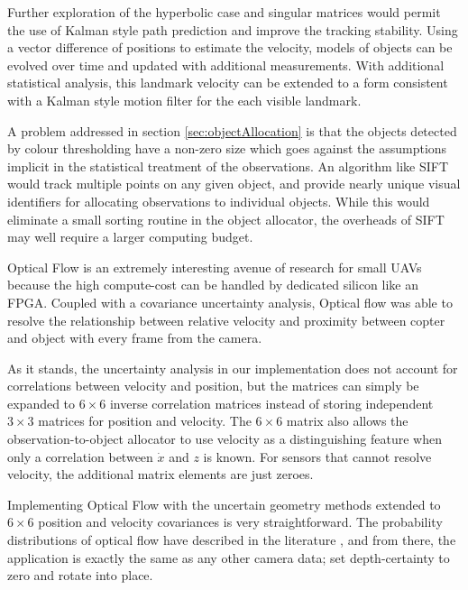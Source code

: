 \documentclass{article}
\begin{document}
  Further exploration of the hyperbolic case and singular matrices would permit the use of Kalman style path prediction and improve the tracking stability.
  Using a vector difference of positions to estimate the velocity, models of objects can be evolved over time and updated with additional measurements.  With additional statistical analysis, this landmark velocity can be extended to a form consistent with a Kalman style motion filter for the each visible landmark.

  A problem addressed in section \ref{sec:objectAllocation} is that the objects detected by colour thresholding have a non-zero size which goes against the assumptions implicit in the statistical treatment of the observations.  An algorithm like SIFT would track multiple points on any given object, and provide nearly unique visual identifiers for allocating observations to individual objects.  While this would eliminate a small sorting routine in the object allocator, the overheads of SIFT may well require a larger computing budget.

  Optical Flow is an extremely interesting avenue of research for small UAVs because the high compute-cost can be handled by dedicated silicon like an FPGA.  Coupled with a covariance uncertainty analysis, Optical flow was able to resolve the relationship between relative velocity and proximity between copter and object with every frame from the camera.  
  
  As it stands, the uncertainty analysis in our implementation does not account for correlations between velocity and position, but the matrices can simply be expanded to \(6\times6\) inverse correlation matrices instead of storing independent \(3\times3\) matrices for position and velocity.  The \(6\times6\) matrix also allows the observation-to-object allocator to use velocity as a distinguishing feature when only a correlation between \(\dot{x}\) and \(z\) is known.  For sensors that cannot resolve velocity, the additional matrix elements are just zeroes.

  Implementing Optical Flow with the uncertain geometry methods extended to \(6\times6\) position and velocity covariances is very straightforward. The probability distributions of optical flow have described in the literature \cite{FlowUncert}, and from there, the application is exactly the same as any other camera data; set depth-certainty to zero and rotate into place. 


\end{document}
